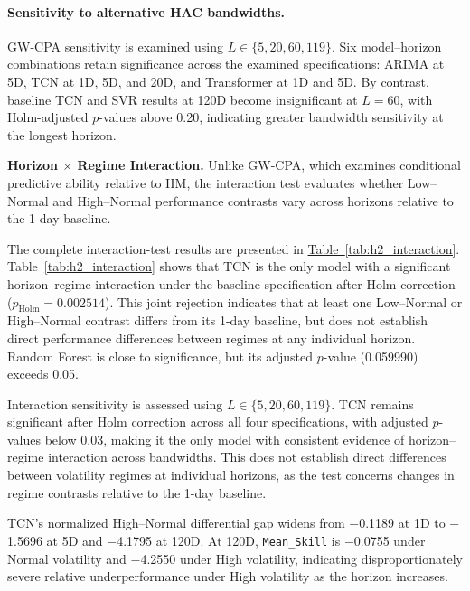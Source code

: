 \documentclass[runningheads,orivec]{llncs}
\begin{document}
\paragraph{Sensitivity to alternative HAC bandwidths.} GW-CPA sensitivity is examined using $L\in\{5,20,60,119\}$. Six model--horizon combinations retain significance across the examined specifications: ARIMA at 5D, TCN at 1D, 5D, and 20D, and Transformer at 1D and 5D. By contrast, baseline TCN and SVR results at 120D become insignificant at $L=60$, with Holm-adjusted $p$-values above 0.20, indicating greater bandwidth sensitivity at the longest horizon.

\noindent\textbf{Horizon $\times$ Regime Interaction.}
Unlike GW-CPA, which examines conditional predictive ability relative to HM, the interaction test evaluates whether Low--Normal and High--Normal performance contrasts vary across horizons relative to the 1-day baseline.

The complete interaction-test results are presented in \hyperref[tab:h2_interaction]{Table~\ref*{tab:h2_interaction}}. Table~\ref*{tab:h2_interaction} shows that TCN is the only model with a significant horizon--regime interaction under the baseline specification after Holm correction ($p_{\mathrm{Holm}}=0.002514$). This joint rejection indicates that at least one Low--Normal or High--Normal contrast differs from its 1-day baseline, but does not establish direct performance differences between regimes at any individual horizon. Random Forest is close to significance, but its adjusted $p$-value (0.059990) exceeds 0.05.

Interaction sensitivity is assessed using $L\in\{5,20,60,119\}$. TCN remains significant after Holm correction across all four specifications, with adjusted $p$-values below 0.03, making it the only model with consistent evidence of horizon--regime interaction across bandwidths. This does not establish direct differences between volatility regimes at individual horizons, as the test concerns changes in regime contrasts relative to the 1-day baseline.

TCN's normalized High--Normal differential gap widens from $-$0.1189 at 1D to $-$1.5696 at 5D and $-$4.1795 at 120D. At 120D, \texttt{Mean\_Skill} is $-$0.0755 under Normal volatility and $-$4.2550 under High volatility, indicating disproportionately severe relative underperformance under High volatility as the horizon increases.
\end{document}
